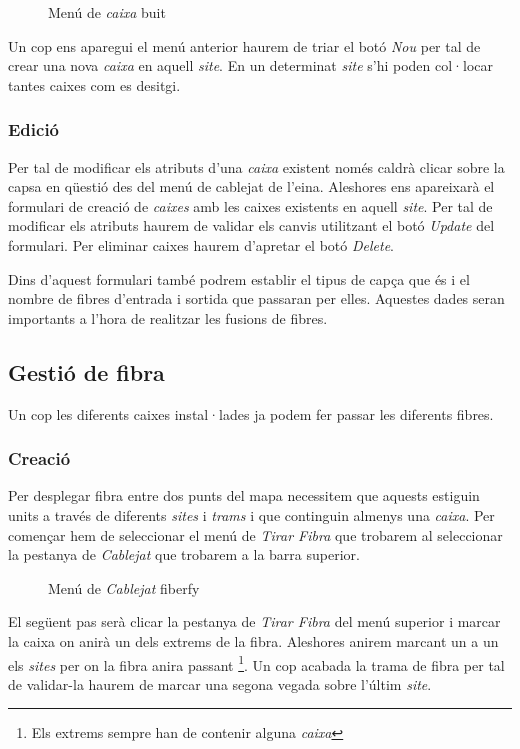 \documentclass[a4paper]{article}
\begin{document}
	\begin{figure}[H]
		\centering
		\caption{Menú de \emph{caixa} buit}
	\end{figure}

	Un cop ens aparegui el menú anterior haurem de triar el botó \emph{Nou} per tal de crear una nova \emph{caixa} en aquell \emph{site}. En un determinat \emph{site} s'hi poden col·locar tantes caixes com es desitgi.
	
	\subsubsection{Edició}
	Per tal de modificar els atributs d'una \emph{caixa} existent només caldrà clicar sobre la capsa en qüestió des del menú de cablejat de l'eina. Aleshores ens apareixarà el formulari de creació de \emph{caixes} amb les caixes existents en aquell \emph{site}. Per tal de modificar els atributs haurem de validar els canvis utilitzant el botó \emph{Update} del formulari. Per eliminar caixes haurem d'apretar el botó \emph{Delete}.
	
	Dins d'aquest formulari també podrem establir el tipus de capça que és i el nombre de fibres d'entrada i sortida que passaran per elles. Aquestes dades seran importants a l'hora de realitzar les fusions de fibres.
	
	\subsection{Gestió de fibra}
	Un cop les diferents caixes instal·lades ja podem fer passar les diferents fibres.
	
	\subsubsection{Creació}
	Per desplegar fibra entre dos punts del mapa necessitem que aquests estiguin units a través de diferents \emph{sites} i \emph{trams} i que continguin almenys una \emph{caixa}.
	Per començar hem de seleccionar el menú de \emph{Tirar Fibra} que trobarem al seleccionar la pestanya de \emph{Cablejat} que trobarem a la barra superior.
	
	\begin{figure}[H]
		\centering
		\caption{Menú de \emph{Cablejat} fiberfy}
	\end{figure}

	El següent pas serà clicar la pestanya de \emph{Tirar Fibra} del menú superior i marcar la caixa on anirà un dels extrems de la fibra. Aleshores anirem marcant un a un els \emph{sites} per on la fibra anira passant \footnote{Els extrems sempre han de contenir alguna \emph{caixa}}. Un cop acabada la trama de fibra per tal de validar-la haurem de marcar una segona vegada sobre l'últim \emph{site}.
	
\end{document}
